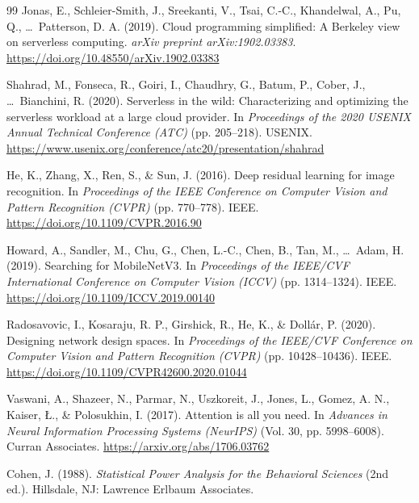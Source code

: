 \documentclass[10pt,twocolumn,a4paper]{article}
\theoremstyle{definition}
\theoremstyle{plain}
\begin{document}
\begin{thebibliography}{99}
Jonas, E., Schleier-Smith, J., Sreekanti, V., Tsai, C.-C., Khandelwal, A., Pu, Q., \ldots\ Patterson, D. A. (2019).
\newblock Cloud programming simplified: A Berkeley view on serverless computing.
\newblock \textit{arXiv preprint arXiv:1902.03383}. \url{https://doi.org/10.48550/arXiv.1902.03383}

Shahrad, M., Fonseca, R., Goiri, I., Chaudhry, G., Batum, P., Cober, J., \ldots\ Bianchini, R. (2020).
\newblock Serverless in the wild: Characterizing and optimizing the serverless workload at a large cloud provider.
\newblock In \textit{Proceedings of the 2020 USENIX Annual Technical Conference (ATC)} (pp. 205--218). USENIX. \url{https://www.usenix.org/conference/atc20/presentation/shahrad}

He, K., Zhang, X., Ren, S., \& Sun, J. (2016).
\newblock Deep residual learning for image recognition.
\newblock In \textit{Proceedings of the IEEE Conference on Computer Vision and Pattern Recognition (CVPR)} (pp. 770--778). IEEE. \url{https://doi.org/10.1109/CVPR.2016.90}

Howard, A., Sandler, M., Chu, G., Chen, L.-C., Chen, B., Tan, M., \ldots\ Adam, H. (2019).
\newblock Searching for MobileNetV3.
\newblock In \textit{Proceedings of the IEEE/CVF International Conference on Computer Vision (ICCV)} (pp. 1314--1324). IEEE. \url{https://doi.org/10.1109/ICCV.2019.00140}

Radosavovic, I., Kosaraju, R. P., Girshick, R., He, K., \& Doll\'{a}r, P. (2020).
\newblock Designing network design spaces.
\newblock In \textit{Proceedings of the IEEE/CVF Conference on Computer Vision and Pattern Recognition (CVPR)} (pp. 10428--10436). IEEE. \url{https://doi.org/10.1109/CVPR42600.2020.01044}

Vaswani, A., Shazeer, N., Parmar, N., Uszkoreit, J., Jones, L., Gomez, A. N., Kaiser, {\L}., \& Polosukhin, I. (2017).
\newblock Attention is all you need.
\newblock In \textit{Advances in Neural Information Processing Systems (NeurIPS)} (Vol. 30, pp. 5998--6008). Curran Associates. \url{https://arxiv.org/abs/1706.03762}

Cohen, J. (1988).
\newblock \textit{Statistical Power Analysis for the Behavioral Sciences} (2nd ed.).
\newblock Hillsdale, NJ: Lawrence Erlbaum Associates.


\end{thebibliography}
\end{document}
